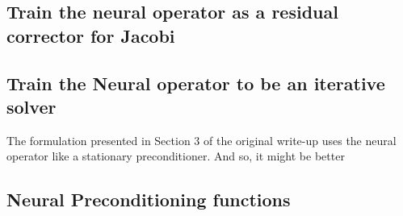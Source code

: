\documentclass[12pt]{article}
\begin{document}



\subsection{Train the neural operator as a residual corrector for Jacobi}
\subsection{Train the Neural operator to be an iterative solver}

The formulation presented in Section 3 of the original write-up uses the neural operator like a stationary preconditioner. And so, it might be better 

\subsection{Neural Preconditioning functions}
\end{document}
